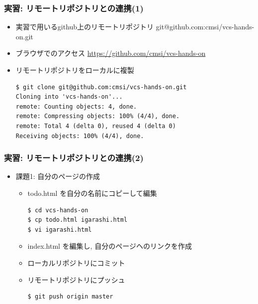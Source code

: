 \begin{frame}[t,fragile]
  \frametitle{実習: リモートリポジトリとの連携(1)}
  \begin{itemize}
  \item 実習で用いるgithub上のリモートリポジトリ git@github.com:cmsi/vcs-hands-on.git
  \item ブラウザでのアクセス \url{https://github.com/cmsi/vcs-hands-on}
  \item リモートリポジトリをローカルに複製
\begin{lstlisting}
$ git clone git@github.com:cmsi/vcs-hands-on.git
Cloning into 'vcs-hands-on'...
remote: Counting objects: 4, done.
remote: Compressing objects: 100% (4/4), done.
remote: Total 4 (delta 0), reused 4 (delta 0)
Receiving objects: 100% (4/4), done.
\end{lstlisting}
  \end{itemize}
\end{frame}

\begin{frame}[t,fragile]
  \frametitle{実習: リモートリポジトリとの連携(2)}
  \begin{itemize}
  \item 課題1: 自分のページの作成
    \begin{itemize}
      \item todo.html を自分の名前にコピーして編集
\begin{lstlisting}
$ cd vcs-hands-on
$ cp todo.html igarashi.html
$ vi igarashi.html
\end{lstlisting}
      \item index.html を編集し, 自分のページヘのリンクを作成
      \item ローカルリポジトリにコミット
      \item リモートリポジトリにプッシュ
\begin{lstlisting}
$ git push origin master
\end{lstlisting}
    \end{itemize}
  \end{itemize}
\end{frame}

